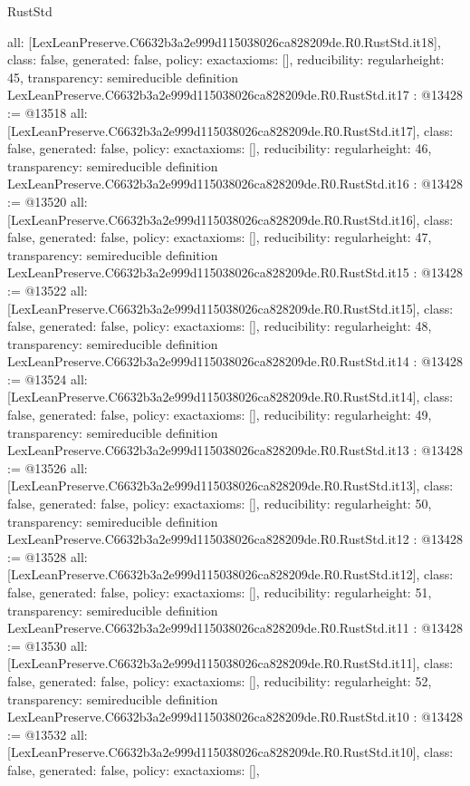 \begin{lexlean}{RustStd}
\begin{coremodule}
{  all: [LexLeanPreserve.C6632b3a2e999d115038026ca828209de.R0.RustStd.it18],
  class: false,
  generated: false,
  policy: exact{axioms: []},
  reducibility: regular{height: 45},
  transparency: semireducible
}
definition LexLeanPreserve.C6632b3a2e999d115038026ca828209de.R0.RustStd.it17 : @13428 := @13518 {
  all: [LexLeanPreserve.C6632b3a2e999d115038026ca828209de.R0.RustStd.it17],
  class: false,
  generated: false,
  policy: exact{axioms: []},
  reducibility: regular{height: 46},
  transparency: semireducible
}
definition LexLeanPreserve.C6632b3a2e999d115038026ca828209de.R0.RustStd.it16 : @13428 := @13520 {
  all: [LexLeanPreserve.C6632b3a2e999d115038026ca828209de.R0.RustStd.it16],
  class: false,
  generated: false,
  policy: exact{axioms: []},
  reducibility: regular{height: 47},
  transparency: semireducible
}
definition LexLeanPreserve.C6632b3a2e999d115038026ca828209de.R0.RustStd.it15 : @13428 := @13522 {
  all: [LexLeanPreserve.C6632b3a2e999d115038026ca828209de.R0.RustStd.it15],
  class: false,
  generated: false,
  policy: exact{axioms: []},
  reducibility: regular{height: 48},
  transparency: semireducible
}
definition LexLeanPreserve.C6632b3a2e999d115038026ca828209de.R0.RustStd.it14 : @13428 := @13524 {
  all: [LexLeanPreserve.C6632b3a2e999d115038026ca828209de.R0.RustStd.it14],
  class: false,
  generated: false,
  policy: exact{axioms: []},
  reducibility: regular{height: 49},
  transparency: semireducible
}
definition LexLeanPreserve.C6632b3a2e999d115038026ca828209de.R0.RustStd.it13 : @13428 := @13526 {
  all: [LexLeanPreserve.C6632b3a2e999d115038026ca828209de.R0.RustStd.it13],
  class: false,
  generated: false,
  policy: exact{axioms: []},
  reducibility: regular{height: 50},
  transparency: semireducible
}
definition LexLeanPreserve.C6632b3a2e999d115038026ca828209de.R0.RustStd.it12 : @13428 := @13528 {
  all: [LexLeanPreserve.C6632b3a2e999d115038026ca828209de.R0.RustStd.it12],
  class: false,
  generated: false,
  policy: exact{axioms: []},
  reducibility: regular{height: 51},
  transparency: semireducible
}
definition LexLeanPreserve.C6632b3a2e999d115038026ca828209de.R0.RustStd.it11 : @13428 := @13530 {
  all: [LexLeanPreserve.C6632b3a2e999d115038026ca828209de.R0.RustStd.it11],
  class: false,
  generated: false,
  policy: exact{axioms: []},
  reducibility: regular{height: 52},
  transparency: semireducible
}
definition LexLeanPreserve.C6632b3a2e999d115038026ca828209de.R0.RustStd.it10 : @13428 := @13532 {
  all: [LexLeanPreserve.C6632b3a2e999d115038026ca828209de.R0.RustStd.it10],
  class: false,
  generated: false,
  policy: exact{axioms: []},
}
\end{coremodule}
\end{lexlean}
